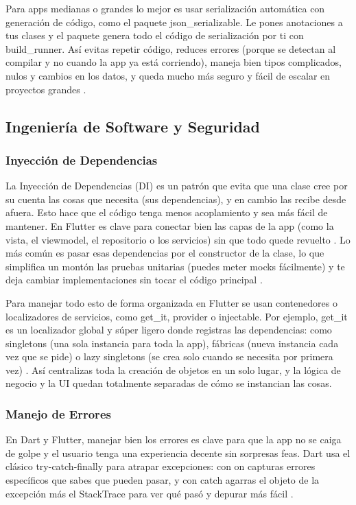 Para apps medianas o grandes lo mejor es usar serialización automática con generación de código, como el paquete json\_serializable. Le pones anotaciones a tus clases y el paquete genera todo el código de serialización por ti con build\_runner. Así evitas repetir código, reduces errores (porque se detectan al compilar y no cuando la app ya está corriendo), maneja bien tipos complicados, nulos y cambios en los datos, y queda mucho más seguro y fácil de escalar en proyectos grandes \cite{PubJsonSerializable, FlutterJsonDocs}.

\subsection{Ingeniería de Software y Seguridad}

\subsubsection{Inyección de Dependencias}
La Inyección de Dependencias (DI) es un patrón que evita que una clase cree por su cuenta las cosas que necesita (sus dependencias), y en cambio las recibe desde afuera. Esto hace que el código tenga menos acoplamiento y sea más fácil de mantener. En Flutter es clave para conectar bien las capas de la app (como la vista, el viewmodel, el repositorio o los servicios) sin que todo quede revuelto \cite{FlutterDocComunicacionCapas}. Lo más común es pasar esas dependencias por el constructor de la clase, lo que simplifica un montón las pruebas unitarias (puedes meter mocks fácilmente) y te deja cambiar implementaciones sin tocar el código principal \cite{MediumDIInjector}.

Para manejar todo esto de forma organizada en Flutter se usan contenedores o localizadores de servicios, como get\_it, provider o injectable. Por ejemplo, get\_it es un localizador global y súper ligero donde registras las dependencias: como singletons (una sola instancia para toda la app), fábricas (nueva instancia cada vez que se pide) o lazy singletons (se crea solo cuando se necesita por primera vez) \cite{Q2BInyeccionDependencias}. Así centralizas toda la creación de objetos en un solo lugar, y la lógica de negocio y la UI quedan totalmente separadas de cómo se instancian las cosas.

\subsubsection{Manejo de Errores}
En Dart y Flutter, manejar bien los errores es clave para que la app no se caiga de golpe y el usuario tenga una experiencia decente sin sorpresas feas. Dart usa el clásico try-catch-finally para atrapar excepciones: con on capturas errores específicos que sabes que pueden pasar, y con catch agarras el objeto de la excepción más el StackTrace para ver qué pasó y depurar más fácil \cite{MediumManejoErroresDart}.

